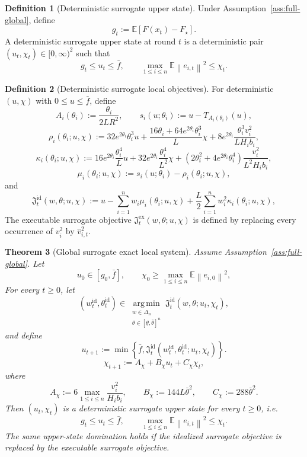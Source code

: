 \documentclass{article}
\newtheorem{theorem}{Theorem}[section]
\theoremstyle{definition}
\newtheorem{definition}[theorem]{Definition}
\newcommand{\EE}{\mathbb E}
\newcommand{\argmin}{\operatorname*{arg\,min}}
\newcommand{\norm}[1]{\left\lVert #1\right\rVert}
\begin{document}
\begin{definition}[Deterministic surrogate upper state]
\label{def:surrogate-state}
Under Assumption~\ref{ass:full-global}, define
\[
g_t:=\EE[F(x_t)-F_\star].
\]
A deterministic surrogate upper state at round $t$ is a deterministic pair
$(u_t,\chi_t)\in[0,\infty)^2$ such that
\[
g_t\le u_t\le \bar f,
\qquad
\max_{1\le i\le n}\EE\norm{e_{i,t}}^2\le \chi_t.
\]
\end{definition}

\begin{definition}[Deterministic surrogate local objectives]
\label{def:sur-obj}
For deterministic $(u,\chi)$ with $0\le u\le \bar f$, define
\[
A_i(\theta_i):=\frac{\theta_i}{2LR^2},
\qquad
s_i(u;\theta_i):=u-T_{A_i(\theta_i)}(u),
\]
\[
\rho_i(\theta_i;u,\chi)
:=
32 e^{2\theta_i}\theta_i^3 u
+
\frac{16\theta_i+64 e^{2\theta_i}\theta_i^3}{L}\chi
+
8 e^{2\theta_i}\frac{\theta_i^3 v_i^2}{L H_i b_i},
\]
\[
\kappa_i(\theta_i;u,\chi)
:=
16 e^{2\theta_i}\frac{\theta_i^4}{L}u
+
32 e^{2\theta_i}\frac{\theta_i^4}{L^2}\chi
+
\left(2\theta_i^2+4 e^{2\theta_i}\theta_i^4\right)\frac{v_i^2}{L^2 H_i b_i},
\]
\[
\mu_i(\theta_i;u,\chi):=s_i(u;\theta_i)-\rho_i(\theta_i;u,\chi),
\]
and
\[
\mathfrak J_t^{\mathrm{id}}(w,\theta;u,\chi)
:=
u
-
\sum_{i=1}^n w_i\mu_i(\theta_i;u,\chi)
+
\frac{L}{2}\sum_{i=1}^n w_i^2\kappa_i(\theta_i;u,\chi),
\]
The executable surrogate objective
$\mathfrak J_t^{\mathrm{ex}}(w,\theta;u,\chi)$ is defined by replacing every
occurrence of $v_i^2$ by $\widehat v_{i,t}^2$.
\end{definition}

\begin{theorem}[Global surrogate exact local system]
\label{th:sur-system}
Assume Assumption~\ref{ass:full-global}. Let
\begin{equation}
u_0\in[g_0,\bar f],
\qquad
\chi_0\ge \max_{1\le i\le n}\EE\norm{e_{i,0}}^2,
\label{eq:sur-init-main}\end{equation}
For every $t\ge 0$, let
\[
(w_t^{\mathrm{id}},\theta_t^{\mathrm{id}})
\in
\argmin_{\substack{w\in\Delta_n\\ \theta\in[\underline\theta,\bar\theta]^n}}
\mathfrak J_t^{\mathrm{id}}(w,\theta;u_t,\chi_t),
\]
and define
\begin{equation}
u_{t+1}
:=
\min\!\left\{
\bar f,
\mathfrak J_t^{\mathrm{id}}(w_t^{\mathrm{id}},\theta_t^{\mathrm{id}};u_t,\chi_t)
\right\}.
\label{eq:u-rec-main}\end{equation}
\[
\chi_{t+1}
:=
A_\chi+B_\chi u_t+C_\chi\chi_t,
\]
where
\[
A_\chi:=6\max_{1\le i\le n}\frac{v_i^2}{H_i b_i},
\qquad
B_\chi:=144L\bar\theta^2,
\qquad
C_\chi:=288\bar\theta^2.
\]
Then $(u_t,\chi_t)$ is a deterministic surrogate upper state for every
$t\ge 0$, i.e.
\begin{equation}
g_t\le u_t\le \bar f,
\qquad
\max_{1\le i\le n}\EE\norm{e_{i,t}}^2\le \chi_t.
\label{eq:sur-system-main}\end{equation}
The same upper-state domination holds if the idealized surrogate objective is
replaced by the executable surrogate objective.
\end{theorem}
\end{document}
